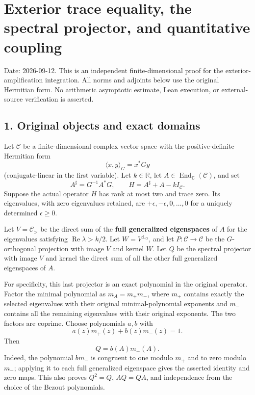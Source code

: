 \section{Exterior trace equality, the spectral projector, and quantitative coupling}\label{exterior-trace-equality-the-spectral-projector-and-quantitative-coupling}

Date: 2026-09-12. This is an independent finite-dimensional proof for the exterior-amplification integration. All norms and adjoints below use the original Hermitian form. No arithmetic asymptotic estimate, Lean execution, or external-source verification is asserted.

\subsection{1. Original objects and exact domains}\label{original-objects-and-exact-domains}

Let \(\mathcal C\) be a finite-dimensional complex vector space with the positive-definite Hermitian form
\[
\langle x,y\rangle_G=x^*Gy
\]
(conjugate-linear in the first variable). Let \(k\in\mathbb R\), let \(A\in\operatorname{End}_{\mathbb C}(\mathcal C)\), and set
\[
A^\sharp=G^{-1}A^*G,\qquad H=A^\sharp+A-kI_{\mathcal C}.
\]
Suppose the actual operator \(H\) has rank at most two and trace zero. Its eigenvalues, with zero eigenvalues retained, are \(+\epsilon,-\epsilon,0,\ldots,0\) for a uniquely determined \(\epsilon\geq0\).

Let \(V=\mathcal C_>\) be the direct sum of the \textbf{full generalized eigenspaces} of \(A\) for the eigenvalues satisfying \(\operatorname{Re}\lambda>k/2\). Let \(W=V^{\perp_G}\), and let \(P:\mathcal C\to\mathcal C\) be the \(G\)-orthogonal projection with image \(V\) and kernel \(W\). Let \(Q\) be the spectral projector with image \(V\) and kernel the direct sum of all the other full generalized eigenspaces of \(A\).

For specificity, this last projector is an exact polynomial in the original operator. Factor the minimal polynomial as \(m_A=m_+m_-\), where \(m_+\) contains exactly the selected eigenvalues with their original minimal-polynomial exponents and \(m_-\) contains all the remaining eigenvalues with their original exponents. The two factors are coprime. Choose polynomials \(a,b\) with
\[
a(z)m_+(z)+b(z)m_-(z)=1.
\]
Then
\[
Q=b(A)m_-(A).
\]
Indeed, the polynomial \(bm_-\) is congruent to one modulo \(m_+\) and to zero modulo \(m_-\); applying it to each full generalized eigenspace gives the asserted identity and zero maps. This also proves \(Q^2=Q\), \(AQ=QA\), and independence from the choice of the Bezout polynomials.

